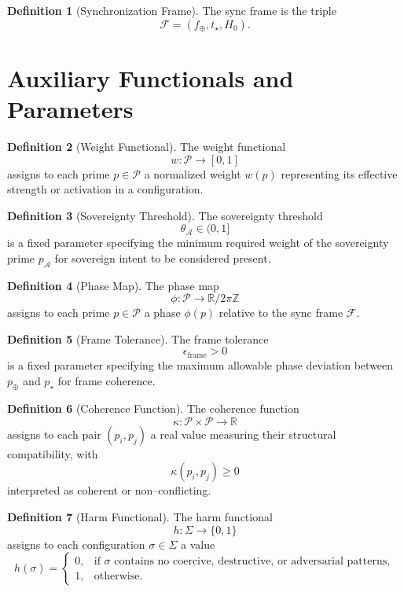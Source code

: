 \documentclass[12pt]{article}
\theoremstyle{definition}
\newtheorem{definition}{Definition}[section]
\theoremstyle{plain}
\begin{document}
\begin{definition}[Synchronization Frame]
The sync frame is the triple
\[
\mathcal{F} = (f_{\oplus}, t_{\star}, H_0).
\]
\end{definition}

\section{Auxiliary Functionals and Parameters}

\begin{definition}[Weight Functional]
The weight functional
\[
w : \mathcal{P} \to [0,1]
\]
assigns to each prime \(p \in \mathcal{P}\) a normalized weight \(w(p)\) representing its effective strength or activation in a configuration.
\end{definition}

\begin{definition}[Sovereignty Threshold]
The sovereignty threshold
\[
\theta_{\mathcal{A}} \in (0,1]
\]
is a fixed parameter specifying the minimum required weight of the sovereignty prime \(p_{\mathcal{A}}\) for sovereign intent to be considered present.
\end{definition}

\begin{definition}[Phase Map]
The phase map
\[
\phi : \mathcal{P} \to \mathbb{R} / 2\pi\mathbb{Z}
\]
assigns to each prime \(p \in \mathcal{P}\) a phase \(\phi(p)\) relative to the sync frame \(\mathcal{F}\).
\end{definition}

\begin{definition}[Frame Tolerance]
The frame tolerance
\[
\epsilon_{\mathrm{frame}} > 0
\]
is a fixed parameter specifying the maximum allowable phase deviation between \(p_{\oplus}\) and \(p_{\star}\) for frame coherence.
\end{definition}

\begin{definition}[Coherence Function]
The coherence function
\[
\kappa : \mathcal{P} \times \mathcal{P} \to \mathbb{R}
\]
assigns to each pair \((p_i,p_j)\) a real value measuring their structural compatibility, with
\[
\kappa(p_i,p_j) \ge 0
\]
interpreted as coherent or non--conflicting.
\end{definition}

\begin{definition}[Harm Functional]
The harm functional
\[
h : \Sigma \to \{0,1\}
\]
assigns to each configuration \(\sigma \in \Sigma\) a value
\[
h(\sigma) =
\begin{cases}
0, & \text{if } \sigma \text{ contains no coercive, destructive, or adversarial patterns},\\
1, & \text{otherwise}.
\end{cases}
\]
\end{definition}
\end{document}
